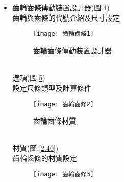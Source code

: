 \begin{itemize}
		\qquad 根據設計參數所生成之渦輪的各細項尺寸\\
		\begin{figure}[hbt!]
		\begin{center}
		\texttt{[image: 渦輪6]}
		\caption{\Large 計算結果尺寸}\label{2.35}
		\end{center}
		\end{figure}
		\\
		建立模型(圖.\ref{2.36}、圖.\ref{2.37}) \\
		\begin{figure}[hbt!]
		\begin{center}
		\texttt{[image: 渦輪模型]}
		\caption{\Large 渦輪模型}\label{2.36}
		\end{center}
		\end{figure}
		\\
		\begin{figure}[hbt!]
		\begin{center}
		\texttt{[image: 渦桿模型]}
		\caption{\Large 渦桿模型}\label{2.37}
		\end{center}
		\end{figure}
		\\
\newpage
	\item 齒輪齒條傳動裝置設計器(圖.\ref{2.38}) \\
		\qquad 齒輪與齒條的代號介紹及尺寸設定\\
		\begin{figure}[hbt!]
		\begin{center}
		\texttt{[image: 齒輪齒條1]}
		\caption{\Large 齒輪齒條傳動裝置設計器}\label{2.38}
		\end{center}
		\end{figure}
		\\
		選項(圖.\ref{2.39}) \\
		\qquad 設定尺條類型及計算條件\\
		\begin{figure}[hbt!]
		\begin{center}
		\texttt{[image: 齒輪齒條2]}
		\caption{\Large 齒輪齒條材質}\label{2.39}
		\end{center}
		\end{figure}
		\\
		材質(圖.\ref{2.40}) \\
		\qquad 齒輪齒條的材質設定\\
		\begin{figure}[hbt!]
		\begin{center}
		\texttt{[image: 齒輪齒條3]}

\end{center}
\end{figure}
\end{itemize}

